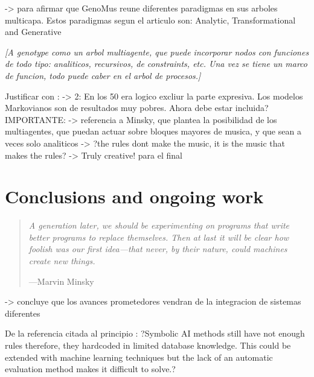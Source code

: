 \documentclass{article}
\begin{document}
{\color{red}

\cite{quteprints6544} -> para afirmar que GenoMus reune diferentes paradigmas en sus arboles multicapa. Estos paradigmas segun el articulo son: Analytic, Transformational and Generative
}

{\color{gray} \textsl{[A genotype como un arbol multiagente, que puede incorporar nodos con funciones de todo tipo: analiticos, recursivos, de constraints, etc. Una vez se tiene un marco de funcion, todo puede caber en el arbol de procesos.]}}


{\color{red}

Justificar con \cite{LopezdeMantaras:2006:MMA:1565082.1565089}:
	-> 2: En los 50 era logico excliur la parte expresiva. Los modelos Markovianos son de resultados muy pobres. Ahora debe estar incluida?
IMPORTANTE:
	-> referencia a Minsky, que plantea la posibilidad de los multiagentes, que puedan actuar sobre bloques mayores de musica, y que sean a veces solo analiticos
	-> ?the rules dont make the music, it is the music that makes the rules?
	-> Truly creative! para el final
}


\section{Conclusions and ongoing work}

\begin{samepage}
\begin{quotation}
\textsl{A generation later, we should be experimenting on programs
that write better programs to replace themselves. Then
at last it will be clear how foolish was our first idea---that
never, by their nature, could machines create new things.}

---Marvin Minsky \cite{DBLP:journals/aim/Minsky82}
\end{quotation}
\end{samepage}

{\color{red}

\cite{Papadopoulos99aimethods} -> concluye que los avances prometedores vendran de la integracion de sistemas diferentes

De la referencia citada al principio \cite{LopezRincon2018}: ?Symbolic AI methods still have not enough rules therefore,
they hardcoded in limited database knowledge. This could be
extended with machine learning techniques but the lack of an
automatic evaluation method makes it difficult to solve.?

}
\end{document}
